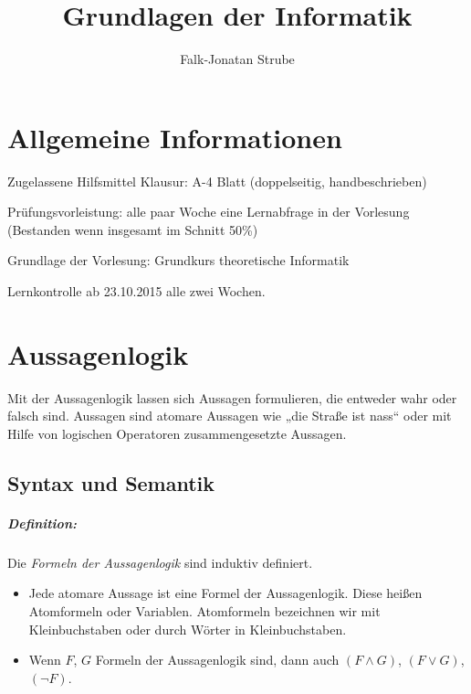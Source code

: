 \documentclass{scrreprt}
\title{Grundlagen der Informatik}
\author{Falk-Jonatan Strube}
\begin{document}
\maketitle
\tableofcontents

\chapter*{Allgemeine Informationen}

Zugelassene Hilfsmittel Klausur: A-4 Blatt (doppelseitig, handbeschrieben)

Prüfungsvorleistung: alle paar Woche eine Lernabfrage in der Vorlesung (Bestanden wenn insgesamt im Schnitt 50\%)

Grundlage der Vorlesung: Grundkurs theoretische Informatik \cite{hollas2007grundkurs}

Lernkontrolle ab 23.10.2015 alle zwei Wochen.

\chapter{Aussagenlogik}

Mit der Aussagenlogik lassen sich Aussagen formulieren, die entweder wahr oder falsch sind. Aussagen sind atomare Aussagen wie „die Straße ist nass“ oder mit Hilfe von logischen Operatoren zusammengesetzte Aussagen.

\section{Syntax und Semantik}

\paragraph{Definition:} Die \emph{Formeln der Aussagenlogik} sind induktiv definiert.

\begin{itemize}
\item Jede atomare Aussage ist eine Formel der Aussagenlogik. Diese heißen Atomformeln oder Variablen. 
Atomformeln bezeichnen wir mit Kleinbuchstaben oder durch Wörter in Kleinbuchstaben.
\item Wenn $F$, $G$ Formeln der Aussagenlogik sind, dann auch $(F \wedge G)$, $(F\vee G)$, $(\neg F)$.
\end{itemize}
\end{document}
